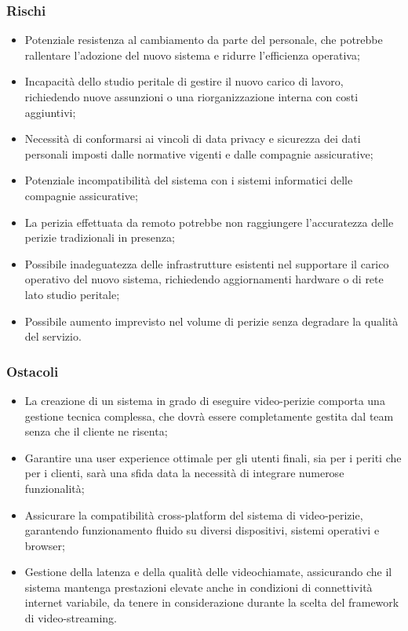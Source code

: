 \documentclass[a4paper,12pt, openright]{report}
\begin{document}
\subsubsection{Rischi}
\begin{itemize}
    \item Potenziale resistenza al cambiamento da parte del personale, che potrebbe rallentare l'adozione del nuovo sistema e ridurre l'efficienza operativa;
    \item Incapacità dello studio peritale di gestire il nuovo carico di lavoro, richiedendo nuove assunzioni o una riorganizzazione interna con costi aggiuntivi;
    \item Necessità di conformarsi ai vincoli di data privacy e sicurezza dei dati personali imposti dalle normative vigenti e dalle compagnie assicurative;
    \item Potenziale incompatibilità del sistema con i sistemi informatici delle compagnie assicurative;
    \item La perizia effettuata da remoto potrebbe non raggiungere l'accuratezza delle perizie tradizionali in presenza;
    \item Possibile inadeguatezza delle infrastrutture esistenti nel supportare il carico operativo del nuovo sistema, richiedendo aggiornamenti hardware o di rete lato studio peritale;
    \item Possibile aumento imprevisto nel volume di perizie senza degradare la qualità del servizio.
\end{itemize}

\subsubsection{Ostacoli}
\begin{itemize}
    \item La creazione di un sistema in grado di eseguire video-perizie comporta una gestione tecnica complessa, che dovrà essere completamente gestita dal team senza che il cliente ne risenta;
    \item Garantire una user experience ottimale per gli utenti finali, sia per i periti che per i clienti, sarà una sfida data la necessità di integrare numerose funzionalità;
    \item Assicurare la compatibilità cross-platform del sistema di video-perizie, garantendo funzionamento fluido su diversi dispositivi, sistemi operativi e browser;
    \item Gestione della latenza e della qualità delle videochiamate, assicurando che il sistema mantenga prestazioni elevate anche in condizioni di connettività internet variabile, da tenere in considerazione durante la scelta del framework di video-streaming.
\end{itemize}
\end{document}
